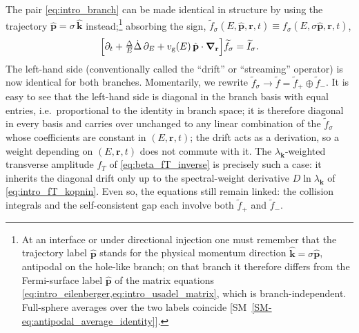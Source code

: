 \documentclass[
  aps,
  prb,
  preprint,
  superscriptaddress,
  longbibliography,
  nofootinbib
]{revtex4-2}
\newcommand{\br}{\mathbf{r}}
\newcommand{\bk}{\mathbf{k}}
\newcommand{\bp}{\mathbf{p}}
\newcommand{\bnabla}{\boldsymbol{\nabla}}
\newcommand{\vg}{v_{\mathrm{g}}}
\newcommand{\fT}{f_T}
\begin{document}
The pair \cref{eq:intro_branch} can be made identical in structure by using the trajectory \(\hat{\bp}=\sigma\,\hat{\bk}\) instead;\footnote{At an interface or under directional injection one must remember that the trajectory label \(\hat{\bp}\) stands for the physical momentum direction \(\hat{\bk}=\sigma\hat{\bp}\), antipodal on the hole-like branch; on that branch it therefore differs from the Fermi-surface label \(\hat{\bp}\) of the matrix equations \cref{eq:intro_eilenberger,eq:intro_usadel_matrix}, which is branch-independent. Full-sphere averages over the two labels coincide [SM~\cref{SM-eq:antipodal_average_identity}].} absorbing the sign, \(\widetilde f_\sigma(E,\hat{\bp},\br,t)\equiv f_\sigma(E,\sigma\hat{\bp},\br,t)\),
\begin{equation}
  \Bigl[\partial_t+\tfrac{\Delta}{E}\dot{\Delta}\,\partial_E
  +\vg(E)\,\hat{\bp}\cdot\bnabla_{\br}\Bigr]\widetilde f_\sigma
  = \widetilde I_\sigma .
  \label{eq:intro_branch_traj}
\end{equation}
The left-hand side (conventionally called the ``drift'' or
``streaming'' operator) is now identical for both branches. 
Momentarily, we rewrite \(\widetilde f_\sigma \to \widetilde f = \widetilde f_+ \oplus \widetilde f_-\).
It is easy to see that the left-hand side is diagonal in the branch basis with equal entries, i.e.\ proportional to the identity in branch space; it is therefore diagonal in every basis and carries over unchanged to any linear combination of the \(\widetilde f_\sigma\) whose coefficients are constant in \((E,\br,t)\); the drift acts as a derivation, so a weight depending on \((E,\br,t)\) does not commute with it. The \(\lambda_{\bk}\)-weighted transverse amplitude \(\fT\) of \cref{eq:beta_fT_inverse} is precisely such a case: it inherits the diagonal drift only up to the spectral-weight derivative \(D\ln\lambda_{\bk}\) of \cref{eq:intro_fT_kopnin}. Even so, the equations still remain linked: the collision integrals and the self-consistent gap each involve both \(\widetilde f_+\) and \(\widetilde f_-\).
\end{document}
